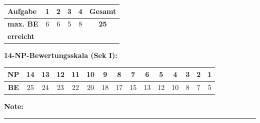 \documentclass[11pt, a4paper]{article}
\newcommand{\luecke}[1]{\rule{#1}{0.4pt}}
\begin{document}
\noindent
\begin{tabularx}{\textwidth}{|X|c|c|c|c||c|}
\hline
\textbf{Aufgabe} & 1 & 2 & 3 & 4 & \textbf{Gesamt} \\
\hline
\textbf{max. BE} & 6 & 6 & 5 & 8 & \textbf{25} \\
\hline
\textbf{erreicht} & & & & & \\[0.8em]
\hline
\end{tabularx}

\vspace{15pt}


\noindent\textbf{14-NP-Bewertungsskala (Sek I):}

\vspace{0.5em}

\noindent
\begin{tabularx}{\textwidth}{|c|c|c|c|c|c|c|c|c|c|c|c|c|c|c|}
\hline
\textbf{NP} & 14 & 13 & 12 & 11 & 10 & 9 & 8 & 7 & 6 & 5 & 4 & 3 & 2 & 1 \\
\hline
\textbf{BE} & 25 & 24 & 23 & 22 & 20 & 18 & 17 & 15 & 13 & 12 & 10 & 8 & 7 & 5 \\
\hline
\end{tabularx}

\vspace{10pt}

\begin{flushright}
\textbf{Note:} \luecke{2cm}
\end{flushright}
\end{document}
